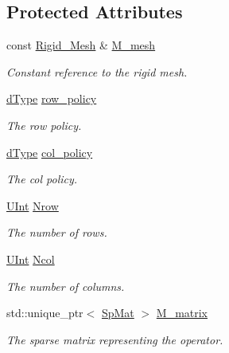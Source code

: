 \subsection*{Protected Attributes}
\begin{DoxyCompactItemize}
\item 
const \hyperlink{classFVCode3D_1_1Rigid__Mesh}{Rigid\+\_\+\+Mesh} \& \hyperlink{classFVCode3D_1_1global__Operator_a027911d0f801f6f19a3006329ec30a7f}{M\+\_\+mesh}
\begin{DoxyCompactList}\small\item\em Constant reference to the rigid mesh. \end{DoxyCompactList}\item 
\hyperlink{classFVCode3D_1_1global__Operator_a9e94fbe56b84ba80f9e9be56c808e5c3}{d\+Type} \hyperlink{classFVCode3D_1_1global__Operator_a744e41dcb69dc9d482c4810f15cdd76e}{row\+\_\+policy}
\begin{DoxyCompactList}\small\item\em The row policy. \end{DoxyCompactList}\item 
\hyperlink{classFVCode3D_1_1global__Operator_a9e94fbe56b84ba80f9e9be56c808e5c3}{d\+Type} \hyperlink{classFVCode3D_1_1global__Operator_a98d57128fb49513da10f3ba6fcbfa839}{col\+\_\+policy}
\begin{DoxyCompactList}\small\item\em The col policy. \end{DoxyCompactList}\item 
\hyperlink{namespaceFVCode3D_a4bf7e328c75d0fd504050d040ebe9eda}{U\+Int} \hyperlink{classFVCode3D_1_1global__Operator_a56146ab59419c1276673ab57d95bbf1c}{Nrow}
\begin{DoxyCompactList}\small\item\em The number of rows. \end{DoxyCompactList}\item 
\hyperlink{namespaceFVCode3D_a4bf7e328c75d0fd504050d040ebe9eda}{U\+Int} \hyperlink{classFVCode3D_1_1global__Operator_a10945c9c802a23ee22d993424aef1ecb}{Ncol}
\begin{DoxyCompactList}\small\item\em The number of columns. \end{DoxyCompactList}\item 
std\+::unique\+\_\+ptr$<$ \hyperlink{namespaceFVCode3D_ac1032289d96638cf0ad6c52ef639095f}{Sp\+Mat} $>$ \hyperlink{classFVCode3D_1_1global__Operator_ab45426efec09f5245e9107794eb7bbd9}{M\+\_\+matrix}
\begin{DoxyCompactList}\small\item\em The sparse matrix representing the operator. \end{DoxyCompactList}\end{DoxyCompactItemize}


